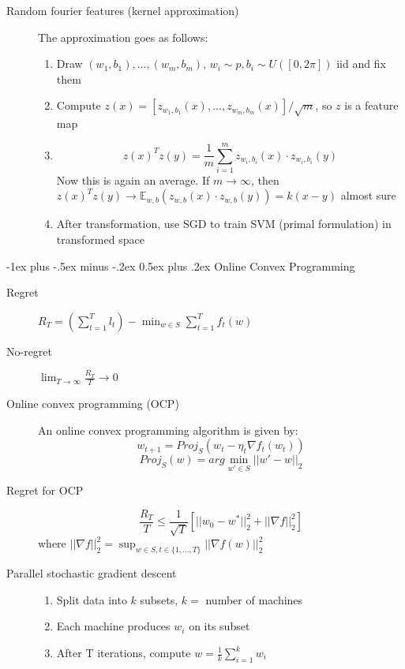 \documentclass[11pt,landscape]{article}
\makeatletter
\renewcommand{\section}{\@startsection{section}{1}{0mm}%
                                {-1ex plus -.5ex minus -.2ex}%
                                {0.5ex plus .2ex}%
                                {\normalfont\normalsize\bfseries}}
\makeatother
\begin{document}
\begin{multicols}{3}
\begin{description}
    \item[Random fourier features (kernel approximation)] The approximation goes as follows:
    \begin{enumerate}
	    \item Draw $(w_1,b_1),...,(w_m,b_m)$, $w_i \sim p, b_i \sim U([0, 2\pi])$ iid and fix them 
	    \item Compute $z(x) = [z_{w_1,b_1}(x),...,z_{w_m,b_m}(x)]/\sqrt{m}$, so $z$ is a feature map
	    \item $$z(x)^T z(y) = \frac{1}{m} \sum_{i=1}^{m} z_{w_i,b_i} (x) \cdot     z_{w_i,b_i} (y)$$
	    Now this is again an average. If $m \rightarrow \infty$, then $z(x)^T z(y)     \rightarrow  \mathbb{E}_{w,b} ( z_{w,b}(x) \cdot z_{w,b} (y) ) = k(x-y)$     almost sure
	    \item After transformation, use SGD to train SVM (primal formulation) in transformed space
    \end{enumerate} 
\end{description}

\section{Online Convex Programming}
\begin{description}
    \item[Regret] $R_T = (\sum_{t=1}^{T} l_t) - \min_{w \in S} \sum_{t=1}^{T} f_t(w)$
    \item[No-regret] $\lim_{T \rightarrow \infty}\frac{R_T}{T} \rightarrow 0$
    \item[Online convex programming (OCP)] An online convex programming algorithm is given by:
        $$ w_{t+1} = Proj_S( w_t - \eta_t \nabla f_t(w_t))$$
        $$ Proj_S(w) = arg \min_{w' \in S} ||w' - w ||_2$$
    \item[Regret for OCP] $$ \frac{R_T}{T} \leq \frac{1}{\sqrt{T}} [||w_0 - w^*||_2^2 + ||\nabla f||_2^2] $$ where $||\nabla f||_2^2 = \sup_{w \in S, t \in \{1,\dots,T\}} ||\nabla f(w)||_2^2 $    
    \item[Parallel stochastic gradient descent]
    \begin{enumerate}
        \item Split data into $k$ subsets, $k =$ number of machines
        \item Each machine produces $w_i$ on its subset
        \item After T iterations, compute $w = \frac{1}{k} \sum_{i = 1}^k w_i$
    \end{enumerate}
\end{description}


\end{multicols}
\end{document}
